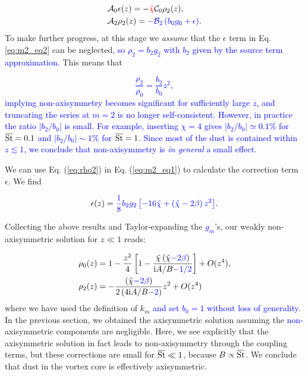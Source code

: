 \documentclass[apj]{emulateapj}
\def\blue#1{\textcolor{blue}{#1}}
\def\red#1{\textcolor{red}{#1}}
\newcommand{\Eq}[1]{Eq. (\ref{#1})}
\newcommand{\eq}[1]{\Eq{#1}}
\newcommand{\beq}{\begin{equation}}
\newcommand{\eeq}{\end{equation}}
\newcommand{\tilchi}{\tilde\chi}
\newcommand{\St}{{\rm St}}
\begin{document}
\begin{align}
&\mathcal{A}_0\epsilon(z) = -\red{\tilchi}\mathcal{C}_0\rho_2(z),\label{eq:m2_eq1}\\
&\mathcal{A}_2\rho_2(z)   = \blue{-\mathcal{B}_2\left(b_0g_0 + \epsilon\right)}.\label{eq:m2_eq2}
\end{align}
To make further progress, at this stage we \emph{assume} that the
$\epsilon$ term in Eq. \ref{eq:m2_eq2} can be neglected\blue{, so $\rho_2 = b_2 g_2$ with $b_2$ given by the source term approximation.} 
This means that  

\blue{
\beq\label{eq:rho2}
\frac{\rho_2}{\rho_0} = \frac{b_2}{b_0}z^2,
\eeq
}
\blue{
implying non-axisymmetry becomes significant for sufficiently large $z$, 
and truncating the series at $m=2$ is no longer self-consistent. 
However, in practice the ratio $|b_2/b_0|$ is small. 
For example, inserting $\chi=4$ gives $|b_2/b_0|\simeq0.1\%$ for
$\overline{\St}=0.1$ and $|b_2/b_0|\sim 1\%$ for $\overline{\St}=1$. Since
most of the dust is contained within $z\lesssim 1$, we conclude that
non-axisymmetry is {\it in general} a small effect.}

We can use \eq{eq:rho2} in \eq{eq:m2_eq1} to
calculate the correction term $\epsilon$. We find

\beq
\epsilon(z) = \blue{\frac{1}{8}b_2g_2\left[-16\tilchi+\left(\tilchi - 2\beta\right)z^2\right]}.
\eeq

Collecting the above results and Taylor-expanding the \blue{$g_m$}'s, our
weakly non-axisymmetric solution for $z\ll 1$ reads:

\begin{align}
&\rho_0(z) =1 -  \frac{z^2}{4}\left[1-\frac{\tilchi\left(\tilchi \blue{- 2\beta}\right)}{\mathrm{i}A/B \blue{- 1/2}}\right]+ O(z^4),\\
&\rho_2(z) =-\frac{\left(\tilchi \blue{- 2\beta}\right)}{2\left(4\mathrm{i}A/B \blue{- 2}\right)}z^2+O(z^4)
\end{align}
where we have used the definition of $k_m$ \blue{and set $b_0=1$
  without loss of generality}. %
In the previous section, we obtained the axisymmetric solution
assuming the \blue{non-}axisymmetric components are negligible. 
Here, we see explicitly that the axisymmetric solution in fact leads
to non-axisymmetry through the coupling terms, but these corrections
are small for $\overline{\St} \ll 1$, because $B \propto \overline{\St}$. We conclude that dust in the vortex core is effectively axisymmetric.
\end{document}
